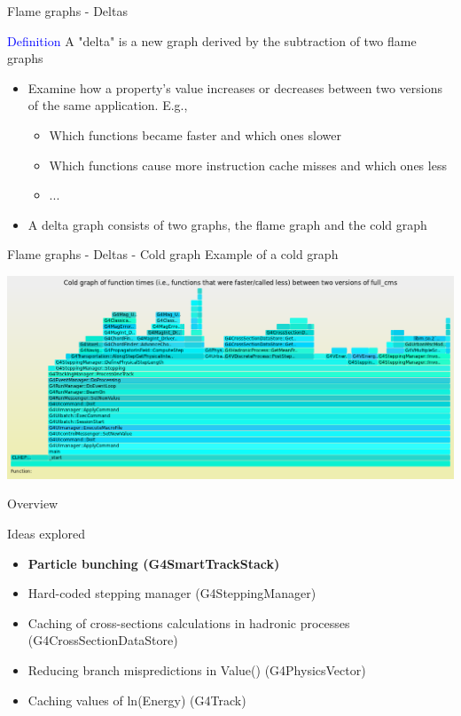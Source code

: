 \documentclass{beamer}
\begin{document}
\begin{frame}{Flame graphs - Deltas}

\textcolor{blue}{Definition} A "delta" is a new graph derived
by the subtraction of two flame graphs
\begin{itemize}
\item Examine how a property's value increases or decreases between two versions
of the same application. E.g.,
\begin{itemize}
\item Which functions became faster and which ones slower
\item Which functions cause more instruction cache misses and which ones less
\item ...
\end{itemize}
\item A delta graph consists of two graphs, the flame graph and the cold graph
\end{itemize}

\end{frame}

\begin{frame}{Flame graphs - Deltas - Cold graph}
Example of a cold graph

\begin{center}
  \includegraphics[width=1.0\textwidth]{dec.png}
\end{center}
\end{frame}

\begin{frame}{Overview}

Ideas explored
\begin{itemize}
  \item {\bf Particle bunching (G4SmartTrackStack) }
  \item Hard-coded stepping manager (G4SteppingManager)
  \item Caching of cross-sections calculations in hadronic processes (G4CrossSectionDataStore)
  \item Reducing branch mispredictions in Value() (G4PhysicsVector)
  \item Caching values of ln(Energy) (G4Track)
\end{itemize}
\end{frame}
\end{document}
